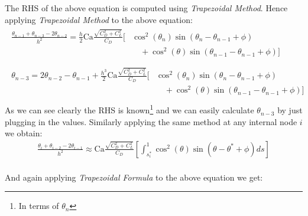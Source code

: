 \documentclass[a4paper,12pt]{report}
\begin{document}
The RHS of the above equation is computed using \textit{Trapezoidal Method}. Hence applying \textit{Trapezoidal Method} to the above equation:
\begin{align}
\begin{split}
\frac{\theta_{n-1}+\theta_{n-3}-2\theta_{n-2}}{h^2} =\frac{h}{2}\text{Ca}\frac{\sqrt{C_D^2+C_L^2}}{C_D}\Biggl[&\cos^2(\theta_n)\sin\left(\theta_n - \theta_{n-1}+\phi\right) \\
&\quad+\cos^2(\theta)\sin\left(\theta_{n-1} - \theta_{n-1}+\phi\right)\Biggl]\\
\end{split}\\
\begin{split}
\theta_{n-3}=2\theta_{n-2}-\theta_{n-1}+ \frac{h^3}{2}\text{Ca}\frac{\sqrt{C_D^2+C_L^2}}{C_D}\Biggl[&\cos^2(\theta_n)\sin\left(\theta_n - \theta_{n-1}+\phi\right)\\
&\quad+\cos^2(\theta)\sin\left(\theta_{n-1} - \theta_{n-1}+\phi\right)\Biggl]\\
\end{split}
\end{align}
As we can see clearly the RHS is known\footnote{In terms of $\theta_n$} and we can easily calculate $\theta_{n-3}$ by just plugging in the values. Similarly applying the same method at any internal node $i$ we obtain:
\begin{align}
\frac{\theta_{i}+\theta_{i-2}-2\theta_{i-1}}{h^2} \approx\text{Ca}\frac{\sqrt{C_D^2+C_L^2}}{C_D}\left[\int_{s_i^{*}}^{1} \cos^2(\theta)\sin\left(\theta - \theta^*+\phi\right) ds\right]
\end{align}\\
\pagebreak
And again applying \textit{Trapezoidal Formula} to the above equation we get:
\end{document}
